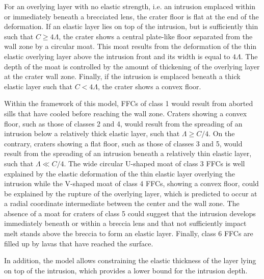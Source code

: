 For an  overlying layer with  no elastic strength, i.e.   an intrusion
emplaced within or  immediately beneath a brecciated  lens, the crater
floor is flat at the end of  the deformation. If an elastic layer lies
on  top  of  the  intrusion,   but  is  sufficiently  thin  such  that
$C\ge 4\Lambda$, the crater shows a central plate-like floor separated
from the  wall zone by  a circular moat.   This moat results  from the
deformation of  the thin elastic  overlying layer above  the intrusion
front and its width  is equal to $4\Lambda$. The depth  of the moat is
controlled by the  amount of thickening of the overlying  layer at the
crater wall  zone.  Finally,  if the intrusion  is emplaced  beneath a
thick elastic layer such that $C< 4\Lambda$, the crater shows a convex
floor.

Within the framework of this model,  FFCs of class 1 would result from
aborted sills that have cooled  before reaching the wall zone. Craters
showing a convex floor, such as those of classes 2 and 4, would result
from the  spreading of an  intrusion below a relatively  thick elastic
layer, such that $\Lambda \ge C/4$. On the contrary, craters showing a
flat floor, such  as those of classes  3 and 5, would  result from the
spreading of  an intrusion  beneath a  relatively thin  elastic layer,
such that $\Lambda \ll C/4$. The  wide circular U-shaped moat of class
3  FFCs is  well  explained by  the elastic  deformation  of the  thin
elastic layer overlying the intrusion while the V-shaped moat of class
4 FFCs, showing  a convex floor, could be explained  by the rupture of
the  overlying  layer,  which  is  predicted  to  occur  at  a  radial
coordinate intermediate  between the  center and  the wall  zone.  The
absence  of a  moat for  craters  of class  5 could  suggest that  the
intrusion develops  immediately beneath or  within a breccia  lens and
that not sufficiently impact melt stands  above the breccia to form an
elastic layer. Finally, class 6 FFCs  are filled up by lavas that have
reached the surface.
	
In addition,  the model allows  constraining the elastic  thickness of
the layer lying on top of  the intrusion, which provides a lower bound
for the intrusion depth.

